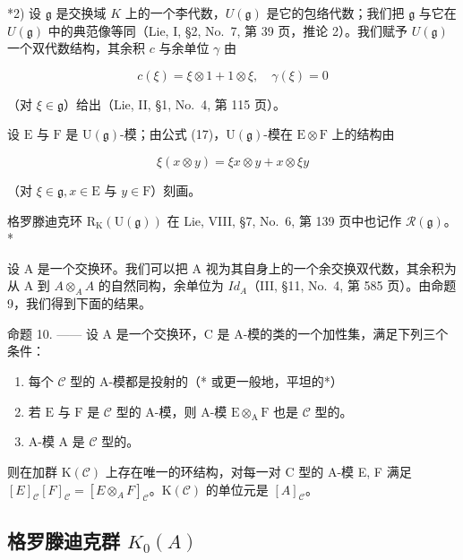 *2) 设 \(\mathfrak{g}\) 是交换域 \(K\) 上的一个李代数，\(U(\mathfrak{g})\) 是它的包络代数；我们把 \(\mathfrak{g}\) 与它在 \(U(\mathfrak{g})\) 中的典范像等同（Lie, I, §2, No.~7, 第 39 页，推论 2）。我们赋予 \(U(\mathfrak{g})\) 一个双代数结构，其余积 \(c\) 与余单位 \(\gamma\) 由

\[
c (\xi) = \xi \otimes 1 + 1 \otimes \xi , \quad \gamma (\xi) = 0\tag{17}
\]

（对 \(\xi\in\mathfrak{g}\)）给出（Lie, II, §1, No.~4, 第 115 页）。

设 \(\mathrm{E}\) 与 \(\mathrm{F}\) 是 \(\mathrm{U}(\mathfrak{g})\)-模；由公式 (17)，\(\mathrm{U}(\mathfrak{g})\)-模在 \(\mathrm{E} \otimes \mathrm{F}\) 上的结构由

\[
\xi (x \otimes y) = \xi x \otimes y + x \otimes \xi y\tag{18}
\]

（对 \(\xi\in\mathfrak{g}, x\in\mathrm{E}\) 与 \(y\in\mathrm{F}\)）刻画。

格罗滕迪克环 \(\mathrm{R}_{\mathrm{K}}(\mathrm{U}(\mathfrak{g}))\) 在 Lie, VIII, §7, No.~6, 第 139 页中也记作 \(\mathcal{R}(\mathfrak{g})\)。*

设 A 是一个交换环。我们可以把 A 视为其自身上的一个余交换双代数，其余积为从 A 到 \(A \otimes_{A} A\) 的自然同构，余单位为 \(Id_{A}\)（III, §11, No.~4, 第 585 页）。由命题 9，我们得到下面的结果。

命题 10. —— 设 A 是一个交换环，C 是 A-模的类的一个加性集，满足下列三个条件：

\begin{enumerate}
\def\labelenumi{(\roman{enumi})}
\item
  每个 \(\mathcal{C}\) 型的 A-模都是投射的（* 或更一般地，平坦的*）
\item
  若 \(\mathrm{E}\) 与 \(\mathrm{F}\) 是 \(\mathcal{C}\) 型的 A-模，则 A-模 \(\mathrm{E} \otimes_{\mathrm{A}} \mathrm{F}\) 也是 \(\mathcal{C}\) 型的。
\item
  A-模 A 是 \(\mathcal{C}\) 型的。
\end{enumerate}

则在加群 \(\mathrm{K}(\mathcal{C})\) 上存在唯一的环结构，对每一对 C 型的 A-模 E, F 满足 \([E]_{\mathcal{C}}[F]_{\mathcal{C}} = [E \otimes_{A} F]_{\mathcal{C}}\)。\(\mathrm{K}(\mathcal{C})\) 的单位元是 \([A]_{\mathcal{C}}\)。

\subsection{\texorpdfstring{格罗滕迪克群 \(K_{0}(A)\)}{格罗滕迪克群 K\_\{0\}(A)}}

